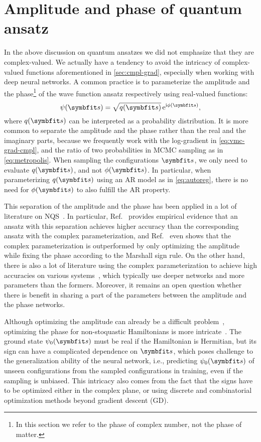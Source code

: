 \section{Amplitude and phase of quantum ansatz}
\label{sec:amp-phase}

In the above discussion on quantum ansatzes we did not emphasize that they are complex-valued. We actually have a tendency to avoid the intricacy of complex-valued functions aforementioned in \cref{sec:cmpl-grad}, especially when working with deep neural networks. A common practice is to parameterize the amplitude and the phase\footnote{In this section we refer to the phase of complex number, not the phase of matter.} of the wave function ansatz respectively using real-valued functions:
\begin{equation}
\psi(\vs) = \sqrt{q(\vs)}\,\rme^{\rmi \phi(\vs)},
\label{eq:psi-q-phi}
\end{equation}
where $q(\vs)$ can be interpreted as a probability distribution. It is more common to separate the amplitude and the phase rather than the real and the imaginary parts, because we frequently work with the log-gradient in \cref{eq:vmc-grad-cmpl}, and the ratio of two probabilities in MCMC sampling as in \cref{eq:metropolis}. When sampling the configurations $\vs$, we only need to evaluate $q(\vs)$, and not $\phi(\vs)$. In particular, when parameterizing $q(\vs)$ using an AR model as in \cref{eq:autoreg}, there is no need for $\phi(\vs)$ to also fulfill the AR property.

This separation of the amplitude and the phase has been applied in a lot of literature on NQS~\cite{torlai2018neural, hibat2020recurrent, astrakhantsev2021broken}. In particular, Ref.~\cite{bukov2021learning} provides empirical evidence that an ansatz with this separation achieves higher accuracy than the corresponding ansatz with the complex parameterization, and Ref.~\cite{wang2024variational} even shows that the complex parameterization is outperformed by only optimizing the amplitude while fixing the phase according to the Marshall sign rule. On the other hand, there is also a lot of literature using the complex parameterization to achieve high accuracies on various systems~\cite{roth2020iterative, li2022bridging, viteritti2023transformer}, which typically use deeper networks and more parameters than the formers. Moreover, it remains an open question whether there is benefit in sharing a part of the parameters between the amplitude and the phase networks.

Although optimizing the amplitude can already be a difficult problem~\cite{bukov2021learning, park2022expressive}, optimizing the phase for non-stoquastic Hamiltonians is more intricate~\cite{westerhout2020generalization, szabo2020neural}. The ground state $\psi_0(\vs)$ must be real if the Hamiltonian is Hermitian, but its sign can have a complicated dependence on $\vs$, which poses challenge to the generalization ability of the neural network, i.e., predicting $\psi_0(\vs)$ of unseen configurations from the sampled configurations in training, even if the sampling is unbiased. This intricacy also comes from the fact that the signs have to be optimized either in the complex plane, or using discrete and combinatorial optimization methods beyond gradient descent (GD).


